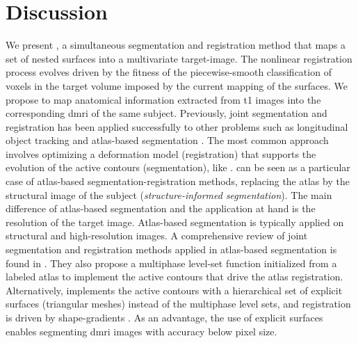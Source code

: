 \section{Discussion}
\label{sec:regseg-discussion}
We present \regseg{}, a simultaneous segmentation and registration method that
  maps a set of nested surfaces into a multivariate target-image.
The nonlinear registration process evolves driven by the fitness of the
  piecewise-smooth classification of voxels in the target volume imposed
  by the current mapping of the surfaces.
We propose \regseg{} to map anatomical information extracted from \gls*{t1}
  images into the corresponding \gls*{dmri} of the same subject.
Previously, joint segmentation and registration has been applied successfully to
  other problems such as longitudinal object tracking \citep{paragios_level_2003}
  and atlas-based segmentation \citep{gorthi_active_2011}.
The most common approach involves optimizing a deformation model (registration)
  that supports the evolution of the active contours (segmentation),
  like \cite{paragios_level_2003,yezzi_variational_2003}.
\Regseg{} can be seen as a particular case of atlas-based segmentation-registration methods,
  replacing the atlas by the structural image of the subject (\emph{structure-informed segmentation}).
The main difference of atlas-based segmentation and the application at hand is the resolution of the
  target image.
Atlas-based segmentation is typically applied on structural and high-resolution images.
A comprehensive review of joint segmentation and registration methods applied in atlas-based
  segmentation is found in \citep{gorthi_active_2011}.
They also propose a multiphase level-set function initialized from a labeled atlas to implement
  the active contours that drive the atlas registration.
Alternatively, \regseg{} implements the active contours with a hierarchical set of explicit
  surfaces (triangular meshes) instead of the multiphase level sets, and registration
  is driven by shape-gradients \citep{herbulot_segmentation_2006}.
As an advantage, the use of explicit surfaces enables segmenting \gls*{dmri} images
  with accuracy below pixel size.


